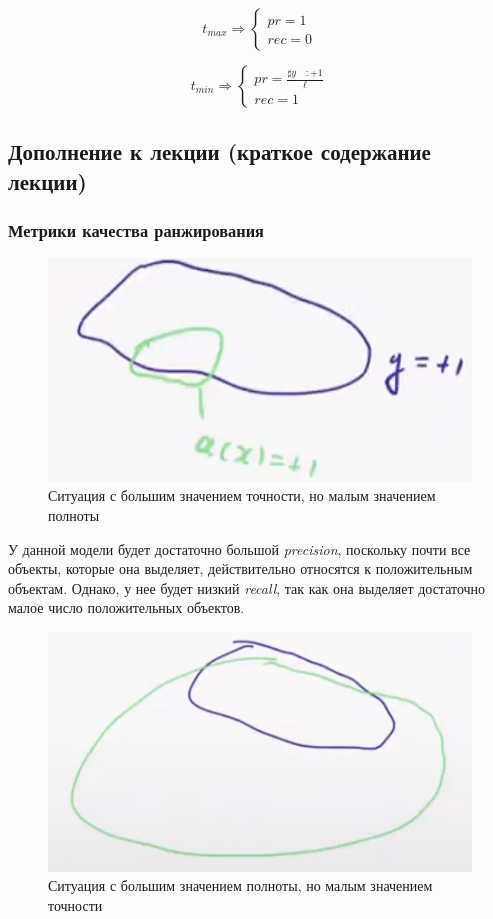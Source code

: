             \begin{equation*}
             t_{max} \Longrightarrow
             \begin{cases}
               pr = 1
               \\
               rec = 0
             \end{cases}
            \end{equation*}

            \begin{equation*}
             t_{min} \Longrightarrow
             \begin{cases}
               pr = \frac{\sharp y \quad : +1}{\ell}
               \\
               rec = 1
             \end{cases}
            \end{equation*}

        \subsection{Дополнение к лекции (краткое содержание лекции)}

        \subsubsection{Метрики качества ранжирования}

            \begin{figure}[H]
                \centering
                \includegraphics[width=0.4 \textwidth]{images/5lecture/Precision_set_interpretation.png}
                \caption{Ситуация с большим значением точности, но малым значением полноты}
            \end{figure}
            У данной модели будет достаточно большой \textit{precision}, поскольку почти все объекты, которые она выделяет, действительно относятся к положительным объектам. Однако, у нее будет низкий \textit{recall}, так как она выделяет достаточно малое число положительных объектов.\\

            \begin{figure}[H]
                \centering
                \includegraphics[width=0.4 \textwidth]{images/5lecture/High_recall_set_interpretation.png}
                \caption{Ситуация с большим значением полноты, но малым значением точности}
            \end{figure}

